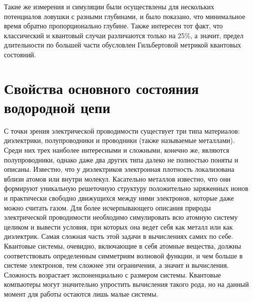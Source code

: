 \documentclass[a4paper, 14pt]{extarticle}
\begin{document}
Такие же измерения и симуляции были осуществлены для нескольких 
потенциалов ловушки с разными глубинами, и было показано, что 
минимальное время обратно пропорционально глубине. Также интересен тот 
факт, что классический и квантовый случаи различаются только на 25\%, 
а значит, предел длительности по большей части обусловлен Гильбертовой 
метрикой квантовых состояний.




\clearpage \section{Свойства основного состояния водородной цепи}

С точки зрения электрической проводимости существует три типа 
материалов: диэлектрики, полупроводники и проводники (также называемые 
металлами). Среди них трех наиболее интересными и сложными, конечно же, 
являются полупроводники, однако даже два других типа далеко не полностью 
поняты и описаны. Известно, что у диэлектриков электронная плотность 
локализована вблизи атомов или внутри молекул. Касательно металлов 
известно, что они формируют уникальную решеточную структуру положительно 
заряженных ионов и практически свободно движущихся между ними 
электронов, которые даже можно считать газом. Для более исчерпывающего 
описания природы электрической проводимости необходимо симулировать всю 
атомную систему целиком и вывести условия, при которых она ведет себя 
как металл или как диэлектрик. Самая сложная часть этой задачи 
в вычислениях самих по себе. Квантовые системы, очевидно, включающие 
в себя атомные вещества, должны соответствовать определенным симметриям 
волновой функции, и чем больше в системе электронов, тем сложнее эти 
ограничения, а значит и вычисления. Сложность возрастает экспоненциально 
с размером системы. Квантовые компьютеры могут значительно упростить 
вычисления такого рода, но на данный момент для работы остаются лишь 
малые системы.

\end{document}
